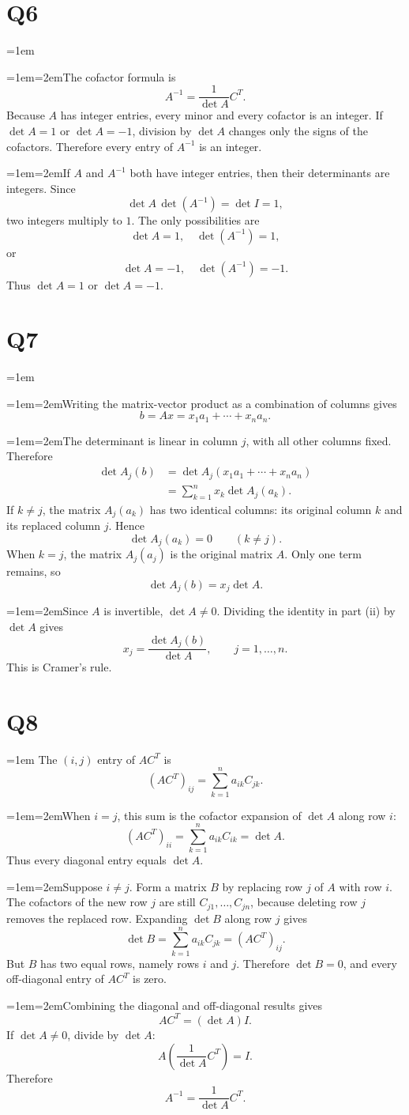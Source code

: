 \documentclass[11pt]{article}
\newcommand{\solutionquestion}[1]{\par\leftskip=0pt\section*{Q#1}\leftskip=1em}
\newcommand{\solutionpart}[1]{\par\smallskip\leftskip=1em\noindent\hangindent=2em\hangafter=1\makebox[1.5em][l]{\textbf{(#1)}}\hspace{0.5em}\ignorespaces}
\begin{document}
\solutionquestion{6}
\solutionpart{i}The cofactor formula is
\[
A^{-1}=\frac{1}{\det A}{C}^{T}.
\]
Because $A$ has integer entries, every minor and every cofactor is an integer. If $\det A=1$ or $\det A=-1$, division by $\det A$ changes only the signs of the cofactors. Therefore every entry of $A^{-1}$ is an integer.

\solutionpart{ii}If $A$ and $A^{-1}$ both have integer entries, then their determinants are integers. Since
\[
\det A\,\det(A^{-1})=\det I=1,
\]
two integers multiply to $1$. The only possibilities are
\[
\det A=1,\quad\det(A^{-1})=1,
\]
or
\[
\det A=-1,\quad\det(A^{-1})=-1.
\]
Thus $\det A=1$ or $\det A=-1$.

\solutionquestion{7}
\solutionpart{i}Writing the matrix-vector product as a combination of columns gives
\[
b=Ax=x_1a_1+\cdots+x_n a_n.
\]

\solutionpart{ii}The determinant is linear in column $j$, with all other columns fixed. Therefore
\[
\begin{aligned}
\det A_j(b)
&=\det A_j(x_1a_1+\cdots+x_n a_n)\\
&=\sum_{k=1}^n x_k\det A_j(a_k).
\end{aligned}
\]
If $k\ne j$, the matrix $A_j(a_k)$ has two identical columns: its original column $k$ and its replaced column $j$. Hence
\[
\det A_j(a_k)=0\qquad(k\ne j).
\]
When $k=j$, the matrix $A_j(a_j)$ is the original matrix $A$. Only one term remains, so
\[
\det A_j(b)=x_j\det A.
\]

\solutionpart{iii}Since $A$ is invertible, $\det A\ne0$. Dividing the identity in part (ii) by $\det A$ gives
\[
x_j=\frac{\det A_j(b)}{\det A},
\qquad j=1,\ldots,n.
\]
This is Cramer's rule.

\solutionquestion{8}
The $(i,j)$ entry of $A{C}^{T}$ is
\[
{(A{C}^{T})}_{ij}=\sum_{k=1}^n a_{ik}C_{jk}.
\]

\solutionpart{i}When $i=j$, this sum is the cofactor expansion of $\det A$ along row $i$:
\[
{(A{C}^{T})}_{ii}=\sum_{k=1}^n a_{ik}C_{ik}=\det A.
\]
Thus every diagonal entry equals $\det A$.

\solutionpart{ii}Suppose $i\ne j$. Form a matrix $B$ by replacing row $j$ of $A$ with row $i$. The cofactors of the new row $j$ are still $C_{j1},\ldots,C_{jn}$, because deleting row $j$ removes the replaced row. Expanding $\det B$ along row $j$ gives
\[
\det B=\sum_{k=1}^n a_{ik}C_{jk}={(A{C}^{T})}_{ij}.
\]
But $B$ has two equal rows, namely rows $i$ and $j$. Therefore $\det B=0$, and every off-diagonal entry of $A{C}^{T}$ is zero.

\solutionpart{iii}Combining the diagonal and off-diagonal results gives
\[
A{C}^{T}=(\det A)I.
\]
If $\det A\ne0$, divide by $\det A$:
\[
A\left(\frac{1}{\det A}{C}^{T}\right)=I.
\]
Therefore
\[
A^{-1}=\frac{1}{\det A}{C}^{T}.
\]
\end{document}
